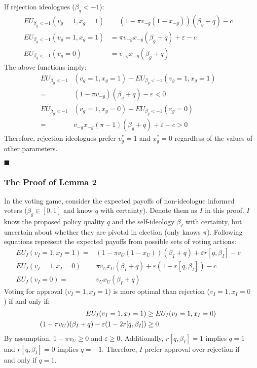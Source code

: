 \par If rejection ideologues ($\beta_g<-1$):
\begin{align*}
EU_{\beta_g<-1}(v_g=1, x_g=1) &= (1-\pi v_{-g} (1- x_{-g}))(\beta_g + q)  - c \\
EU_{\beta_g<-1}(v_g=1, x_g=1) &= \pi v_{-g} x_{-g} (\beta_g + q) + \varepsilon - c \\
EU_{\beta_g<-1}(v_g=0) &= v_{-g} x_{-g} (\beta_g + q)
\end{align*} 
\noindent The above functions imply:
\begin{align*}
EU_{\beta_g<-1}&(v_g=1, x_g=1) - EU_{\beta_g<-1}(v_g=1, x_g=1) \\
=& (1- \pi v_{-g})(\beta_g + q) - \varepsilon < 0 \\
EU_{\beta_g<-1}&(v_g=1, x_g=0) - EU_{\beta_g<-1}(v_g=0) \\
=& v_{-g} x_{-g} (\pi-1) (\beta_g + q) + \varepsilon -c  > 0
\end{align*}
\noindent Therefore, rejection ideologues prefer $v^*_g=1$ and $x^*_g=0$ regardless of the values of other parameters.

\hfill $\blacksquare$

\subsubsection{The Proof of Lemma 2}

\par In the voting game, consider the expected payoffs of non-ideologue informed voters ($\beta_g \in [0,1]$ and know $q$ with certainty). Denote them as $I$ in this proof. $I$   
know the proposed policy quality $q$ and the self-ideology $\beta_I$ with certainty, but uncertain about whether they are pivotal in election (only knows $\pi$). Following equations represent the expected payoffs from possible sets of voting actions:
\begin{align*}
EU_I(v_I=1,x_I=1) = & (1-\pi v_U (1-x_U) ) (\beta_I + q) + \varepsilon r[q, \beta_I] - c \\
EU_I(v_I=1,x_I=0) = &\pi v_U x_U (\beta_I + q) + \varepsilon (1-r[q, \beta_I]) - c \\
EU_I(v_I=0) = &v_U  x_U (\beta_I + q)   
\end{align*}
\noindent Voting for approval ($v_I=1,x_I=1$) is more optimal than rejection ($v_I=1,x_I=0$) if and only if:
\begin{align*}
EU_I(v_I=1,x_I=1) &\geq EU_I(v_I=1,x_I=0)  \notag \\
(1 -\pi v_U ) (\beta_I + q) - \varepsilon (1-2r[q, \beta_I]) &\geq 0 
\end{align*}
\noindent By assumption, $1-\pi v_U \geq 0$ and $\varepsilon \geq 0$. Additionally,  $r[q, \beta_I] = 1$ implies $q = 1$ and $r[q, \beta_I] = 0$ implies $q = -1$. Therefore, $I$ prefer approval over rejection if and only if $q=1$.

